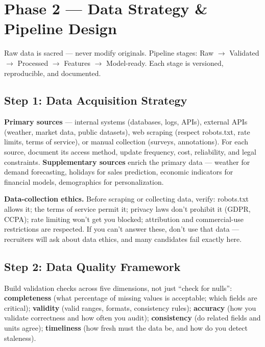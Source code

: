 \section{Phase 2 --- Data Strategy \& Pipeline Design}

\begin{keytakeaway}
Raw data is sacred --- never modify originals. Pipeline stages: Raw $\rightarrow$ Validated $\rightarrow$
Processed $\rightarrow$ Features $\rightarrow$ Model-ready. Each stage is versioned, reproducible, and documented.
\end{keytakeaway}

\subsection{Step 1: Data Acquisition Strategy}

\textbf{Primary sources} --- internal systems (databases, logs, APIs), external APIs (weather, market data, public
datasets), web scraping (respect robots.txt, rate limits, terms of service), or manual collection (surveys,
annotations). For each source, document its access method, update frequency, cost, reliability, and legal
constraints. \textbf{Supplementary sources} enrich the primary data --- weather for demand forecasting, holidays
for sales prediction, economic indicators for financial models, demographics for personalization.

\begin{caution}
\textbf{Data-collection ethics.} Before scraping or collecting data, verify: robots.txt allows it; the terms of
service permit it; privacy laws don't prohibit it (GDPR, CCPA); rate limiting won't get you blocked; attribution
and commercial-use restrictions are respected. If you can't answer these, don't use that data --- recruiters will
ask about data ethics, and many candidates fail exactly here.
\end{caution}

\subsection{Step 2: Data Quality Framework}

Build validation checks across five dimensions, not just ``check for nulls'': \textbf{completeness} (what
percentage of missing values is acceptable; which fields are critical); \textbf{validity} (valid ranges, formats,
consistency rules); \textbf{accuracy} (how you validate correctness and how often you audit); \textbf{consistency}
(do related fields and units agree); \textbf{timeliness} (how fresh must the data be, and how do you detect
staleness).

